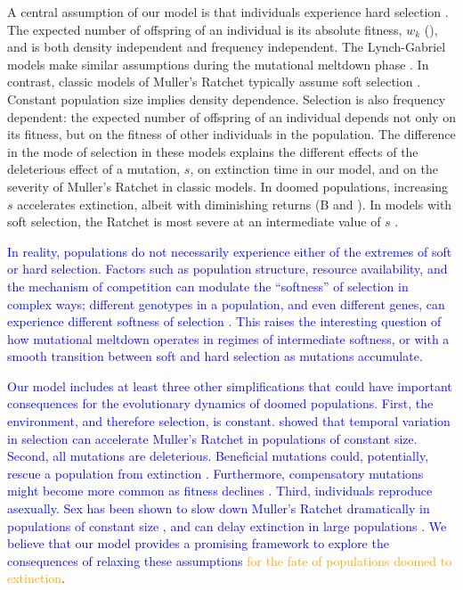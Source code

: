 \documentclass[9pt,lineno]{elife}
\newcommand{\blue}{\textcolor{blue}}
\newcommand{\org}{\textcolor{orange}}
\begin{document}
A central assumption of our model  is that individuals experience hard selection \citep{wal75}.   
The expected number of offspring of an individual is its absolute fitness, $w_k$ (), and is both density independent and frequency independent.  The Lynch-Gabriel models make similar assumptions during the mutational meltdown phase \citep{lyn93,lyn95}. 
% 
In contrast, classic models of Muller's Ratchet typically assume soft selection \citep{wal75}.  Constant population size implies density dependence.  Selection is also frequency dependent: the expected number of offspring of an individual depends not only on its fitness, but on the fitness of other individuals in the population.
%
The difference in the mode of selection in these models explains the different effects of the deleterious effect of a mutation, $s$, on extinction time in our model, and on the severity of Muller's Ratchet in classic models.  In doomed populations, increasing $s$ accelerates extinction, albeit with diminishing returns (B and ).  In models with soft selection, the Ratchet is most severe at an intermediate value of $s$ 
\citep[C;][]{lyn95, Gordo_On_2000, gor00b}.  

\blue{In reality, populations do not necessarily experience either of the extremes of soft or hard selection.  Factors such as population structure, resource availability, and the mechanism of competition can modulate the ``softness'' of selection in complex ways; different genotypes in a population, and even different genes, can experience different softness of selection \citep{laf10, ho12}.  This raises the interesting question of how mutational meltdown operates in regimes of intermediate softness, or with a smooth transition between soft and hard selection as mutations accumulate.}

\blue{Our model includes at least three other simplifications that could have important consequences for the evolutionary dynamics of doomed populations.  
%
First, the environment, and therefore selection, is constant.  \citet{Wardlaw_Temporal_2012} showed that temporal variation in selection can accelerate Muller's Ratchet in populations of constant size.
%
Second, all mutations are deleterious.  Beneficial mutations could, potentially, rescue a population from extinction \citep{mar13}.  Furthermore, compensatory mutations might become more common as fitness declines \citep{poo00, sil07}.
%
Third, individuals reproduce asexually.  Sex has been shown to slow down Muller's Ratchet dramatically in populations of constant size \citep{pam87, cha93}, and can delay extinction in large populations \citep{lyn95a}.
%
We believe that our model provides a promising framework to explore the consequences of relaxing these assumptions} 
\org{for the fate of populations doomed to extinction}.
\end{document}
